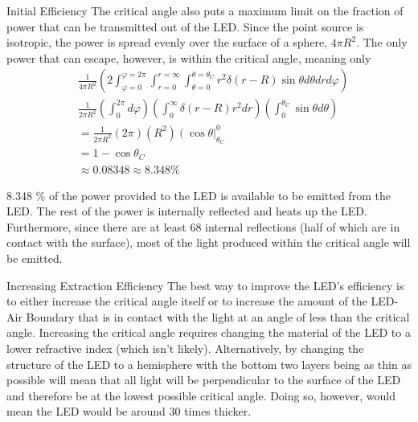 \documentclass[12pt]{article}
\newcommand{\enterProblemHeader}[1]{
	\rhead{#1}
}
\newenvironment{main_section}[1]{
	\section{#1}
	\enterProblemHeader{#1}
}{
	\pagebreak
}
\begin{document}
\begin{main_section}{Initial Efficiency}
	The critical angle also puts a maximum limit on the fraction of power that
	can be transmitted out of the LED. Since the point source is isotropic, the
	power is spread evenly over the surface of a sphere, $4 \pi R^2$. The only
	power that can escape, however, is within the critical angle, meaning only
	\begin{align*}
		&\frac 1 {4 \pi R^2} \left( 2 \int_{\varphi = 0}^{\varphi = 2\pi} \int_{r
		= 0}^{r = \infty} \int_{\theta = 0}^{\theta = \theta_C} r^2 \delta(r -
		R) \sin \theta d\theta dr d\varphi \right)\\
		&\frac 1 {2 \pi R^2} \left( \int_0^{2\pi} d\varphi \right) \left(
		\int_0^\infty \delta(r - R)r^2 dr \right) \left( \int_0^{\theta_C} \sin
		\theta d\theta \right)\\
		&= \frac 1 {2 \pi R^2} (2 \pi) (R^2) \left( \cos \theta
		\right|_{\theta_C}^0\\
		&= 1 - \cos \theta_C\\
		&\approx 0.08348 \approx 8.348\%
	\end{align*}

	8.348 \% of the power provided to the LED is available to be emitted from
	the LED. The rest of the power is internally reflected and heats up the LED.
	Furthermore, since there are at least 68 internal reflections (half of which
	are in contact with the surface), most of the light produced within the
	critical angle will be emitted.

\end{main_section}

\begin{main_section}{Increasing Extraction Efficiency}
	The best way to improve the LED's efficiency is to either increase the
	critical angle itself or to increase the amount of the LED-Air Boundary that
	is in contact with the light at an angle of less than the critical angle.
	Increasing the critical angle requires changing the material of the LED to a
	lower refractive index (which isn't likely). Alternatively, by changing the
	structure of the LED to a hemisphere with the bottom two layers being as
	thin as possible will mean that all light will be perpendicular to the
	surface of the LED and therefore be at the lowest possible critical angle.
	Doing so, however, would mean the LED would be around 30 times thicker.
\end{main_section}
\end{document}
